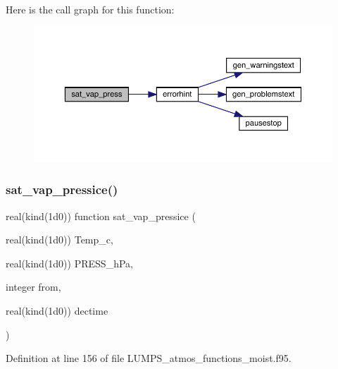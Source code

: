 Here is the call graph for this function\+:\nopagebreak
\begin{figure}[H]
\begin{center}
\leavevmode
\includegraphics[width=350pt]{_l_u_m_p_s__atmos__functions__moist_8f95_a634f4cc5a636b7b311a16a1eb64e133e_cgraph}
\end{center}
\end{figure}
\mbox{\label{_l_u_m_p_s__atmos__functions__moist_8f95_a8e723cdd557d577e5e646808dc572dc1}} 
\subsubsection{\texorpdfstring{sat\+\_\+vap\+\_\+pressice()}{sat\_vap\_pressice()}}
{\footnotesize\ttfamily real(kind(1d0)) function sat\+\_\+vap\+\_\+pressice (\begin{DoxyParamCaption}\item[{real(kind(1d0))}]{Temp\+\_\+c,  }\item[{real(kind(1d0))}]{P\+R\+E\+S\+S\+\_\+h\+Pa,  }\item[{integer}]{from,  }\item[{real(kind(1d0))}]{dectime }\end{DoxyParamCaption})}



Definition at line 156 of file L\+U\+M\+P\+S\+\_\+atmos\+\_\+functions\+\_\+moist.\+f95.

